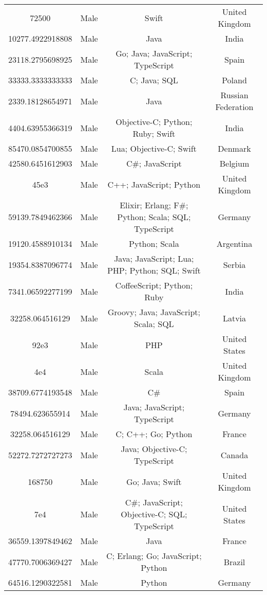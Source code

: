 \begin{center}
\begin{tabular}{ |c|c|c|c| }
72500  &  Male  &  Swift  &  United Kingdom  \\ 
10277.4922918808  &  Male  &  Java  &  India  \\ 
23118.2795698925  &  Male  &  Go; Java; JavaScript; TypeScript  &  Spain  \\ 
33333.3333333333  &  Male  &  C; Java; SQL  &  Poland  \\ 
2339.18128654971  &  Male  &  Java  &  Russian Federation  \\ 
4404.63955366319  &  Male  &  Objective-C; Python; Ruby; Swift  &  India  \\ 
85470.0854700855  &  Male  &  Lua; Objective-C; Swift  &  Denmark  \\ 
42580.6451612903  &  Male  &  C\#; JavaScript  &  Belgium  \\ 
45e3  &  Male  &  C++; JavaScript; Python  &  United Kingdom  \\ 
59139.7849462366  &  Male  &  Elixir; Erlang; F\#; Python; Scala; SQL; TypeScript  &  Germany  \\ 
19120.4588910134  &  Male  &  Python; Scala  &  Argentina  \\ 
19354.8387096774  &  Male  &  Java; JavaScript; Lua; PHP; Python; SQL; Swift  &  Serbia  \\ 
7341.06592277199  &  Male  &  CoffeeScript; Python; Ruby  &  India  \\ 
32258.064516129  &  Male  &  Groovy; Java; JavaScript; Scala; SQL  &  Latvia  \\ 
92e3  &  Male  &  PHP  &  United States  \\ 
4e4  &  Male  &  Scala  &  United Kingdom  \\ 
38709.6774193548  &  Male  &  C\#  &  Spain  \\ 
78494.623655914  &  Male  &  Java; JavaScript; TypeScript  &  Germany  \\ 
32258.064516129  &  Male  &  C; C++; Go; Python  &  France  \\ 
52272.7272727273  &  Male  &  Java; Objective-C; TypeScript  &  Canada  \\ 
168750  &  Male  &  Go; Java; Swift  &  United Kingdom  \\ 
7e4  &  Male  &  C\#; JavaScript; Objective-C; SQL; TypeScript  &  United States  \\ 
36559.1397849462  &  Male  &  Java  &  France  \\ 
47770.7006369427  &  Male  &  C; Erlang; Go; JavaScript; Python  &  Brazil  \\ 
64516.1290322581  &  Male  &  Python  &  Germany  \\ 

\end{tabular}
\end{center}
